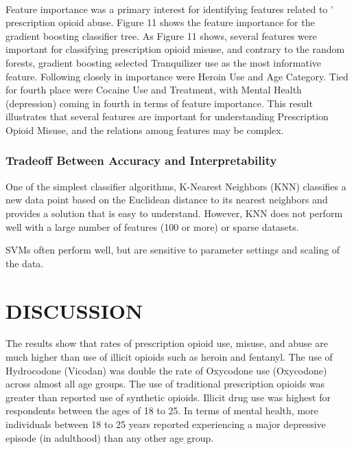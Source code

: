 \\\documentclass[sigconf]{acmart}
\begin{document}
Feature 
importance was a primary interest for identifying features related to '
prescription opioid abuse. Figure 11 shows the feature importance for the 
gradient boosting classifier tree. As Figure 11 shows, several features were 
important for classifying prescription opioid misuse, and contrary to the 
random forests, gradient boosting selected Tranquilizer use as the most 
informative feature. Following closely in importance were Heroin Use and Age 
Category. Tied for fourth place were Cocaine Use and Treatment, with Mental 
Health (depression) coming in fourth in terms of feature importance. This 
result illustrates that several features are important for understanding 
Prescription Opioid Misuse, and the relations among features may be complex.


\subsubsection{Tradeoff Between Accuracy and Interpretability}

One of the simplest classifier algorithms, K-Nearest Neighbors (KNN)
classifies a new data point based on the Euclidean distance to its 
nearest neighbors and provides a solution that is easy to understand. 
However, KNN does not perform well with a large number of features 
(100 or more) or sparse datasets.

SVMs often perform well, but are sensitive to parameter settings 
and scaling of the data. 


\section{DISCUSSION}


The results show that rates of prescription opioid use, misuse, and abuse are
much higher than use of illicit opioids such as heroin and fentanyl. The use 
of Hydrocodone (Vicodan) was double the rate of Oxycodone use (Oxycodone) 
across almost all age groups. The use of traditional prescription opioids 
was greater than reported use of synthetic opioids. Illicit drug use was 
highest for respondents between the ages of 18 to 25. In terms of mental 
health, more individuals between 18 to 25 years reported experiencing a major 
depressive episode (in adulthood) than any other age group. 
\end{document}
